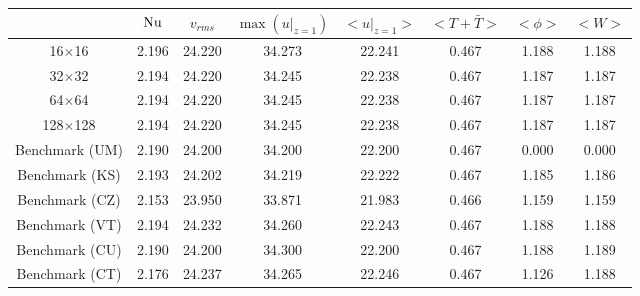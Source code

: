 \begin{tabular}{c|ccccccc}
    & $\mathrm{Nu}$ & $v_{rms}$ & $\max(u|_{z=1})$ & $<u|_{z=1}>$ & $<T + \bar{T}>$ & $<\phi>$ & $<W>$ \\
\hline
16$\times$16 & 2.196 & 24.220 & 34.273 & 22.241 & 0.467 & 1.188 & 1.188 \\
32$\times$32 & 2.194 & 24.220 & 34.245 & 22.238 & 0.467 & 1.187 & 1.187 \\
64$\times$64 & 2.194 & 24.220 & 34.245 & 22.238 & 0.467 & 1.187 & 1.187 \\
128$\times$128 & 2.194 & 24.220 & 34.245 & 22.238 & 0.467 & 1.187 & 1.187 \\
\hline
Benchmark (UM) & 2.190 & 24.200 & 34.200 & 22.200 & 0.467 & 0.000 & 0.000 \\
Benchmark (KS) & 2.193 & 24.202 & 34.219 & 22.222 & 0.467 & 1.185 & 1.186 \\
Benchmark (CZ) & 2.153 & 23.950 & 33.871 & 21.983 & 0.466 & 1.159 & 1.159 \\
Benchmark (VT) & 2.194 & 24.232 & 34.260 & 22.243 & 0.467 & 1.188 & 1.188 \\
Benchmark (CU) & 2.190 & 24.200 & 34.300 & 22.200 & 0.467 & 1.188 & 1.189 \\
Benchmark (CT) & 2.176 & 24.237 & 34.265 & 22.246 & 0.467 & 1.126 & 1.188 \\
\end{tabular}
